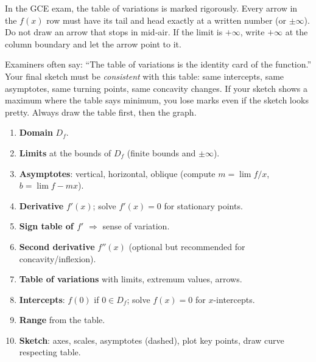 \documentclass[11pt]{article}
\begin{document}
\begin{attention}
In the GCE exam, the table of variations is marked rigorously. Every arrow in the \(f(x)\) row must have its tail and head exactly at a written number (or \(\pm\infty\)). Do not draw an arrow that stops in mid‑air. If the limit is \(+\infty\), write \(+\infty\) at the column boundary and let the arrow point to it.
\end{attention}

\begin{savaistu}
Examiners often say: “The table of variations is the identity card of the function.” Your final sketch must be \emph{consistent} with this table: same intercepts, same asymptotes, same turning points, same concavity changes. If your sketch shows a maximum where the table says minimum, you lose marks even if the sketch looks pretty. Always draw the table first, then the graph.
\end{savaistu}

\begin{methode}
\begin{enumerate}
  \item \textbf{Domain} \(D_f\).
  \item \textbf{Limits} at the bounds of \(D_f\) (finite bounds and \(\pm\infty\)).
  \item \textbf{Asymptotes}: vertical, horizontal, oblique (compute \(m=\lim f/x\), \(b=\lim f-mx\)).
  \item \textbf{Derivative} \(f'(x)\); solve \(f'(x)=0\) for stationary points.
  \item \textbf{Sign table of \(f'\)} \(\Rightarrow\) sense of variation.
  \item \textbf{Second derivative} \(f''(x)\) (optional but recommended for concavity/inflexion).
  \item \textbf{Table of variations} with limits, extremum values, arrows.
  \item \textbf{Intercepts}: \(f(0)\) if \(0\in D_f\); solve \(f(x)=0\) for \(x\)-intercepts.
  \item \textbf{Range} from the table.
  \item \textbf{Sketch}: axes, scales, asymptotes (dashed), plot key points, draw curve respecting table.
\end{enumerate}
\end{methode}
\end{document}
